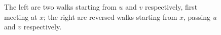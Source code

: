 \documentclass{article}
\begin{document}
\pagestyle{empty}

\begin{figure}[t]
\centering
\label{fig:graph1}

\caption{The left are two walks starting from $u$ and $v$ respectively, first meeting at $x$; the right are reversed walks starting from $x$, passing $u$ and $v$ respectively.}\label{fig:one}
\end{figure}
\end{document}
